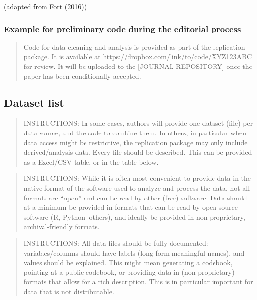 \documentclass[
]{article}
\begin{document}
(adapted from \href{https://doi.org/10.1093/restud/rdw057}{Fort (2016)})

\hypertarget{example-for-preliminary-code-during-the-editorial-process}{%
\subsubsection{Example for preliminary code during the editorial
process}\label{example-for-preliminary-code-during-the-editorial-process}}

\begin{quote}
Code for data cleaning and analysis is provided as part of the
replication package. It is available at
https://dropbox.com/link/to/code/XYZ123ABC for review. It will be
uploaded to the {[}JOURNAL REPOSITORY{]} once the paper has been
conditionally accepted.
\end{quote}

\hypertarget{dataset-list}{%
\subsection{Dataset list}\label{dataset-list}}

\begin{quote}
INSTRUCTIONS: In some cases, authors will provide one dataset (file) per
data source, and the code to combine them. In others, in particular when
data access might be restrictive, the replication package may only
include derived/analysis data. Every file should be described. This can
be provided as a Excel/CSV table, or in the table below.
\end{quote}

\begin{quote}
INSTRUCTIONS: While it is often most convenient to provide data in the
native format of the software used to analyze and process the data, not
all formats are ``open'' and can be read by other (free) software. Data
should at a minimum be provided in formats that can be read by
open-source software (R, Python, others), and ideally be provided in
non-proprietary, archival-friendly formats.
\end{quote}

\begin{quote}
INSTRUCTIONS: All data files should be fully documented:
variables/columns should have labels (long-form meaningful names), and
values should be explained. This might mean generating a codebook,
pointing at a public codebook, or providing data in (non-proprietary)
formats that allow for a rich description. This is in particular
important for data that is not distributable.
\end{quote}
\end{document}
